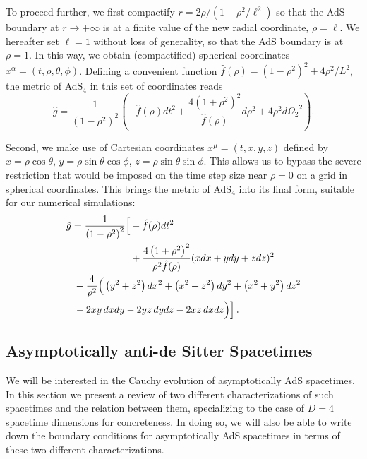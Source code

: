 \documentclass[aps,letterpaper,twocolumn,nofootinbib]{revtex4}
\numberwithin{equation}{section}
\begin{document}
To proceed further, we first compactify $r=2\rho/(1-\rho^2/\ell^2)$ so that the AdS boundary at $r \rightarrow +\infty$ is at a finite value of the new radial coordinate, $\rho=\ell$.
We hereafter set $\ell=1$ without loss of generality, so that the AdS boundary is at $\rho=1$. In this way, we obtain (compactified) spherical coordinates $x^\alpha=(t,\rho,\theta,\phi)$.
Defining a convenient function $\hat{f}(\rho) = (1-\rho^2)^2+4\rho^2/L^2$, the metric of AdS$_4$ in this set of coordinates reads 
\begin{equation}\label{eqn:ads4_compact}
\hat{g} = \frac{1}{(1-\rho^2)^2} \left( -\hat{f}(\rho) dt^2 + \frac{4(1+\rho^2)^2}{\hat{f}(\rho)} d\rho^2 + 4\rho^2 d{\Omega_2}^2 \right).
\end{equation}

Second, we make use of Cartesian coordinates $x^\mu=(t,x,y,z)$ defined by $x=\rho\cos\theta$, $y=\rho\sin\theta\cos\phi$, $z=\rho\sin\theta\sin\phi$.
This allows us to bypass the severe restriction that would be imposed on the time step size near $\rho=0$ on a grid in spherical coordinates.
This brings the metric of AdS$_4$ into its final form, suitable for our numerical simulations:
\begin{align}
\label{eqn:ads4_final}
\hat{g} = \frac{1}{\left(1-\rho^2\right)^2 }\Big[ &-\hat{f}(\rho)dt^2\nonumber\\
&+\frac{4 \left(1+\rho^2\right)^2}{\rho^2 \hat{f}(\rho)} (x dx + y dy + z dz)^2\nonumber\\
&\hspace{-2.0cm}+\frac{4}{\rho^2} \Big(\left(y^2+z^2\right) dx^2 + \left(x^2+z^2\right) dy^2 + \left(x^2+y^2\right) dz^2 \nonumber\\
&\hspace{-2.0cm}-2 x y\, dx dy - 2 y z\, dy dz - 2 x z\,dx dz\Big)\Big]\,.
\end{align}


\subsection{Asymptotically anti-de Sitter Spacetimes}\label{subsec:asyAdS}

We will be interested in the Cauchy evolution of asymptotically AdS spacetimes. 
In this section we present a review of two different characterizations of such spacetimes and the relation between them, specializing to the case of $D=4$ spacetime dimensions for concreteness. 
In doing so, we will also be able to write down the boundary conditions for asymptotically AdS spacetimes in terms of these two different characterizations.
\end{document}
